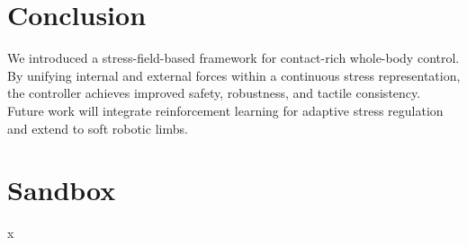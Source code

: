 \documentclass[conference]{IEEEtran}
\begin{document}
\section{Conclusion}
We introduced a stress-field-based framework for contact-rich whole-body control.
By unifying internal and external forces within a continuous stress representation, the controller achieves improved safety, robustness, and tactile consistency.
Future work will integrate reinforcement learning for adaptive stress regulation and extend to soft robotic limbs.

\section{Sandbox}

x
\cite{tensor_touch_2025}
\cite{grip_2025}
\cite{hardware_triaxial_2024}
\cite{tactile_interaction_2024}
\cite{neural_fem_contact_2023}
\cite{triaxial_forces_2023}
\cite{finray_force_2021}
\cite{cnn_stress_2018}
\cite{survey_tactile_2009}
\cite{howe_tactile_1994}



\end{document}
